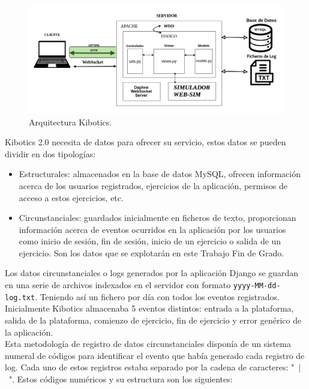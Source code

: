 \documentclass[a4paper, 12pt]{book}
\begin{document}
		\begin{figure}[H]
			\centering
			\includegraphics[width=15cm, keepaspectratio]{img/esquema_Kibotics.png}
			\caption{Arquitectura Kibotics.}
			\label{fig:arquitectura_kibotics}
		\end{figure}
		
		Kibotics 2.0 necesita de datos para ofrecer su servicio, estos datos se pueden dividir en dos tipologías:
		\begin{itemize}
			\item Estructurales: almacenados en la base de datos MySQL, ofrecen información acerca de los usuarios registrados, ejercicios de la aplicación, permisos de acceso a estos ejercicios, etc.
			
			\item Circunstanciales: guardados inicialmente en ficheros de texto, proporcionan información acerca de eventos ocurridos en la aplicación por los usuarios como inicio de sesión, fin de sesión, inicio de un ejercicio o salida de un ejercicio. Son los datos que se explotarán en este Trabajo Fin de Grado.
		\end{itemize}
		
		Los datos circunstanciales o logs generados por la aplicación Django se guardan en una serie de archivos indexados en el servidor con formato \texttt{yyyy-MM-dd-log.txt}. Teniendo así un fichero por día con todos los eventos registrados.\\
		
		Inicialmente Kibotics almacenaba 5 eventos distintos: entrada a la plataforma, salida de la plataforma, comienzo de ejercicio, fin de ejercicio y error genérico de la aplicación. \\
		
		Esta metodología de registro de datos circunstanciales disponía de un sistema numeral de códigos para identificar el evento que había generado cada registro de log. Cada uno de estos registros estaba separado por la cadena de caracteres: "\ |\ ". Estos códigos numéricos y su estructura son los siguientes:
		
\end{document}
